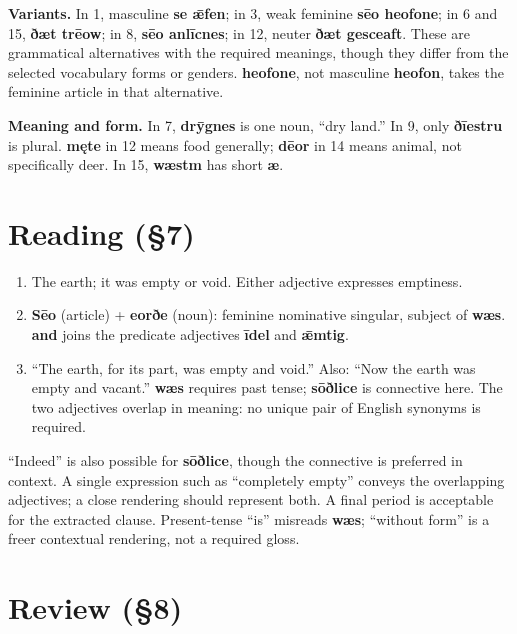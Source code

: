 \clearpage
\textbf{Variants.} In 1, masculine \textbf{se ǣfen}; in 3, weak feminine \textbf{sēo heofone}; in 6 and 15, \textbf{ðæt trēow}; in 8, \textbf{sēo anlīcnes}; in 12, neuter \textbf{ðæt gesceaft}. These are grammatical alternatives with the required meanings, though they differ from the selected vocabulary forms or genders. \textbf{heofone}, not masculine \textbf{heofon}, takes the feminine article in that alternative.


\textbf{Meaning and form.} In 7, \textbf{drȳgnes} is one noun, “dry land.” In 9, only \textbf{ðīestru} is plural. \textbf{męte} in 12 means food generally; \textbf{dēor} in 14 means animal, not specifically deer. In 15, \textbf{wæstm} has short \textbf{æ}.


\section*{Reading (§7)}


\begin{enumerate}
\item[1.] The earth; it was empty or void. Either adjective expresses emptiness.
\item[2.] \textbf{Sēo} (article) + \textbf{eorðe} (noun): feminine nominative singular, subject of \textbf{wæs}. \textbf{and} joins the predicate adjectives \textbf{īdel} and \textbf{ǣmtig}.
\item[3.] “The earth, for its part, was empty and void.” Also: “Now the earth was empty and vacant.” \textbf{wæs} requires past tense; \textbf{sōðlice} is connective here. The two adjectives overlap in meaning: no unique pair of English synonyms is required.
\end{enumerate}


“Indeed” is also possible for \textbf{sōðlice}, though the connective is preferred in context. A single expression such as “completely empty” conveys the overlapping adjectives; a close rendering should represent both. A final period is acceptable for the extracted clause. Present-tense “is” misreads \textbf{wæs}; “without form” is a freer contextual rendering, not a required gloss.


\section*{Review (§8)}


